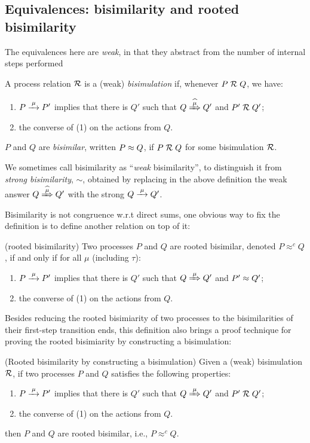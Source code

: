 \subsection{Equivalences: bisimilarity and rooted bisimilarity}
\label{ss:BiEx}

The equivalences here are 
 \emph{weak}, in that they
abstract from the number of internal steps performed
\begin{definition}[bisimilarity]
\label{d:wb}
A process relation ${{\cal R}}$ 
 is a (weak) \emph{bisimulation} if, whenever
 $P\mathrel{\cal R} Q$, %
we have:
\begin{enumerate}
\item 
    $P \arr\mu P'$   implies that there is $Q'$ such that $Q \Arcap \mu Q'$ and $P' \mathrel{\cal R} Q'$;
\item the converse of (1)
 on the actions from $Q$.
\end{enumerate}  
 $P$ and $Q$ are \emph{bisimilar},
written $P \approx
 Q$, if $P \mathrel{\cal R} Q$ for some  bisimulation ${\cal R}$.  
\end{definition} 

We sometimes call bisimilarity as ``\emph{weak} bisimilarity'', to
distinguish it from \emph{strong bisimilarity}, $\sim$,
obtained by replacing in the above definition   the weak answer $
Q\Arcap\mu Q'$ with the strong  $Q \arr \mu Q'$.

Bisimilarity is not congruence w.r.t direct sums, one obvious way to
fix the definition is to define another relation on top of it:
\begin{definition}{(rooted bisimilarity)}
Two processes $P$ and $Q$ are rooted bisimilar, denoted $P
\approx^c Q$, if and only if for all $\mu$ (including $\tau$):
\begin{enumerate}
 \item  $P \arr\mu P'$ implies that there is $Q'$ such that $Q
   \Arr\mu Q'$ and $P' \approx Q'$;
\item the converse of (1) on the actions from $Q$.
\end{enumerate}
\end{definition}
Besides reducing the rooted bisimiarity of two processes to
the bisimilarities of their first-step transition ends, this definition also brings a proof technique for proving the
rooted bisimiarity by constructing a bisimulation:
\begin{lemma}{(Rooted bisimilarity by constructing a bisimulation)}
\label{l:obs_congr_by_weak_bisim}
Given a (weak) bisimulation $\mathrel{\cal R}$, if two processes $P$ and $Q$
satisfies the following properties:
\begin{enumerate}
 \item  $P \arr\mu P'$ implies that there is $Q'$ such that $Q
   \Arr\mu Q'$ and $P' \mathrel{\cal R} Q'$;
\item the converse of (1) on the actions from $Q$.
\end{enumerate}
then $P$ and $Q$ are rooted bisimilar, i.e., $P \approx^c Q$.
\end{lemma}

